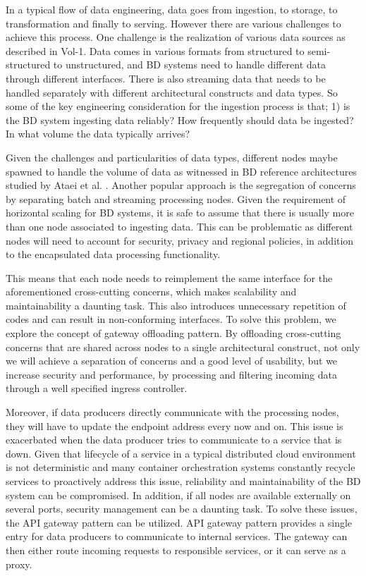 \documentclass{bmcart}
\begin{document}
In a typical flow of data engineering, data goes from ingestion, to storage, to transformation and finally to serving. However there are various challenges to achieve this process. One challenge is the realization of various data sources as described in Vol-1. Data comes in various formats from structured to semi-structured to unstructured, and BD systems need to handle different data through different interfaces. There is also streaming data that needs to be handled separately with different architectural constructs and data types. So some of the key engineering consideration for the ingestion process is that; 1) is the BD system ingesting data reliably? How frequently should data be ingested? In what volume the data typically arrives?

Given the challenges and particularities of data types, different nodes maybe spawned to handle the volume of data as witnessed in BD reference architectures studied by Ataei et al. \cite{ataei2020big}. Another popular approach is the segregation of concerns by separating batch and streaming processing nodes. Given the requirement of horizontal scaling for BD systems, it is safe to assume that there is usually more than one node associated to ingesting data. This can be problematic as different nodes will need to account for security, privacy and regional policies, in addition to the encapsulated data processing functionality. 

This means that each node needs to reimplement the same interface for the aforementioned cross-cutting concerns, which makes scalability and maintainability a daunting task. This also introduces unnecessary repetition of codes and can result in non-conforming interfaces. To solve this problem, we explore the concept of gateway offloading pattern. By offloading cross-cutting concerns that are shared across nodes to a single architectural construct, not only we will achieve a separation of concerns and a good level of usability, but we increase security and performance, by processing and filtering incoming data through a well specified ingress controller.

Moreover, if data producers directly communicate with the processing nodes, they will have to update the endpoint address every now and on. This issue is exacerbated when the data producer tries to communicate to a service that is down. Given that lifecycle of a service in a typical distributed cloud environment is not deterministic and many container orchestration systems constantly recycle services to proactively address this issue, reliability and maintainability of the BD system can be compromised. In addition, if all nodes are available externally on several ports, security management can be a daunting task. To solve these issues, the API gateway pattern can be utilized. API gateway pattern provides a single entry for data producers to communicate to internal services. The gateway can then either route incoming requests to responsible services, or it can serve as a proxy.
\end{document}
